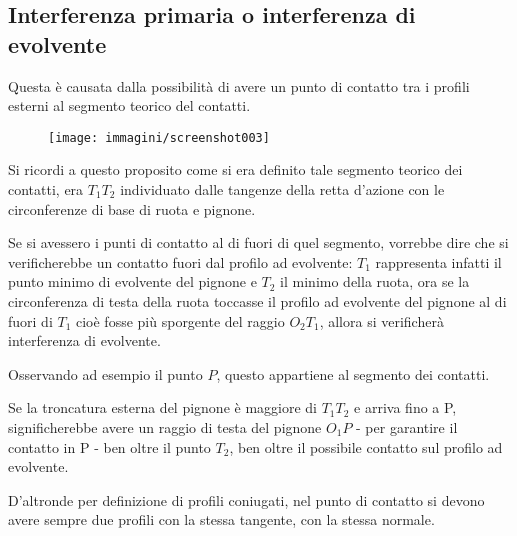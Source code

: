 \documentclass[a4paper, 15pt]{article}
\begin{document}
\subsection{Interferenza primaria o interferenza di evolvente}		
\begin{adjustwidth}{2in}{} 		
		Questa è causata dalla possibilità di avere un punto di contatto tra i profili esterni al segmento teorico del contatti. 
		\begin{figure}[H]
	\centering
	\texttt{[image: immagini/screenshot003]}
	\label{fig:screenshot003.bis}
		\end{figure}		
		Si ricordi a questo proposito come si era definito tale segmento teorico dei contatti, era $T_1T_2$ individuato dalle tangenze della retta d'azione con le circonferenze di base di ruota e pignone. 
		
		Se si avessero i punti di contatto al di fuori di quel segmento, vorrebbe dire che si verificherebbe un contatto fuori dal profilo ad evolvente: $T_1$ rappresenta infatti il punto minimo di evolvente del pignone e $T_2$ il minimo della ruota, ora se la circonferenza di testa della ruota toccasse il profilo ad evolvente del pignone al di fuori di $T_1$ cioè fosse più sporgente del raggio $O_2T_1$, allora si verificherà  interferenza di evolvente.\newline 
		
		Osservando ad esempio il punto $P$, questo appartiene al segmento dei contatti.
		
		Se la troncatura esterna del pignone è maggiore di $T_1T_2$ e arriva fino a P, significherebbe avere un raggio di testa del pignone $O_1P$ - per garantire il contatto in P - ben oltre il punto $T_2$, ben oltre il possibile contatto sul profilo ad evolvente.
		
		D'altronde per definizione di profili coniugati, nel punto di contatto si devono avere sempre due profili con la stessa tangente, con la stessa normale. 
		

\end{adjustwidth}
\end{document}
